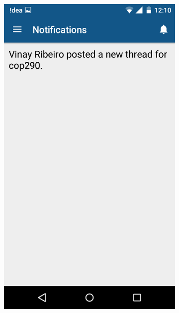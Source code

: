 \documentclass{article}
\begin{document}
\begin{itemize}
\begin{figure}[!h]
\begin{subfigure}{.4\textwidth}
	\includegraphics[width=0.8\linewidth]{pic4}
\end{subfigure}
\begin{subfigure}{.4\textwidth}
  \centering

\end{subfigure}
\end{figure}
\end{itemize}
\end{document}
